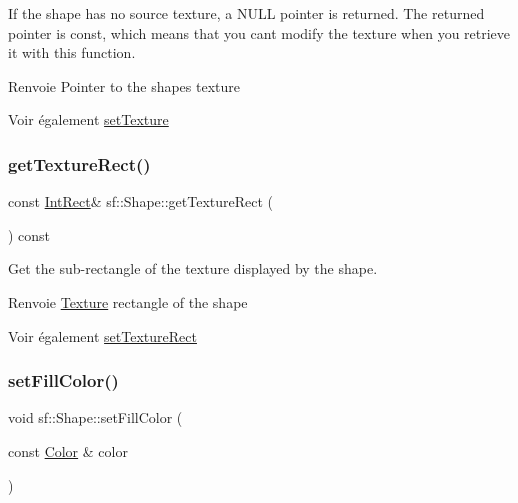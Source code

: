 If the shape has no source texture, a N\+U\+LL pointer is returned. The returned pointer is const, which means that you can\textquotesingle{}t modify the texture when you retrieve it with this function.

\begin{DoxyReturn}{Renvoie}
Pointer to the shape\textquotesingle{}s texture
\end{DoxyReturn}
\begin{DoxySeeAlso}{Voir également}
\hyperlink{classsf_1_1Shape_af8fb22bab1956325be5d62282711e3b6}{set\+Texture} 
\end{DoxySeeAlso}
\mbox{\label{classsf_1_1Shape_ac878aab03c230dc31c44e250d092b9ea}} 
\subsubsection{\texorpdfstring{get\+Texture\+Rect()}{getTextureRect()}}
{\footnotesize\ttfamily const \hyperlink{classsf_1_1Rect}{Int\+Rect}\& sf\+::\+Shape\+::get\+Texture\+Rect (\begin{DoxyParamCaption}{ }\end{DoxyParamCaption}) const}



Get the sub-\/rectangle of the texture displayed by the shape. 

\begin{DoxyReturn}{Renvoie}
\hyperlink{classsf_1_1Texture}{Texture} rectangle of the shape
\end{DoxyReturn}
\begin{DoxySeeAlso}{Voir également}
\hyperlink{classsf_1_1Shape_a2029cc820d1740d14ac794b82525e157}{set\+Texture\+Rect} 
\end{DoxySeeAlso}
\mbox{\label{classsf_1_1Shape_a3506f9b5d916fec14d583d16f23c2485}} 
\subsubsection{\texorpdfstring{set\+Fill\+Color()}{setFillColor()}}
{\footnotesize\ttfamily void sf\+::\+Shape\+::set\+Fill\+Color (\begin{DoxyParamCaption}\item[{const \hyperlink{classsf_1_1Color}{Color} \&}]{color }\end{DoxyParamCaption})}




